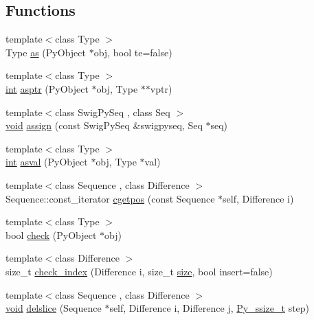 \subsection*{Functions}
\begin{DoxyCompactItemize}
\item 
{\footnotesize template$<$class Type $>$ }\\Type \hyperlink{namespaceswig_a67bb415fcd0242b33b98332e38040546}{as} (Py\+Object $\ast$obj, bool te=false)
\item 
{\footnotesize template$<$class Type $>$ }\\\hyperlink{lp__lib_8h_adeb9ec6400320e4923ac9d836d509ddb}{int} \hyperlink{namespaceswig_aafe1fc46b9f89108d98d52d7bca8942b}{asptr} (Py\+Object $\ast$obj, Type $\ast$$\ast$vptr)
\item 
{\footnotesize template$<$class Swig\+Py\+Seq , class Seq $>$ }\\\hyperlink{lp__lib_8h_ac7828c7b2b31d2e11af17bdb6289c5d9}{void} \hyperlink{namespaceswig_ad10b8f1b53b61dd4a9101e1cd8614262}{assign} (const Swig\+Py\+Seq \&swigpyseq, Seq $\ast$seq)
\item 
{\footnotesize template$<$class Type $>$ }\\\hyperlink{lp__lib_8h_adeb9ec6400320e4923ac9d836d509ddb}{int} \hyperlink{namespaceswig_a0c849f14b53dbad5c78124f7d7be69f1}{asval} (Py\+Object $\ast$obj, Type $\ast$val)
\item 
{\footnotesize template$<$class Sequence , class Difference $>$ }\\Sequence\+::const\+\_\+iterator \hyperlink{namespaceswig_a3e4de99498e78ee45e114f32a533f42e}{cgetpos} (const Sequence $\ast$self, Difference i)
\item 
{\footnotesize template$<$class Type $>$ }\\bool \hyperlink{namespaceswig_a428f235cf1ad33edc806647c1392240d}{check} (Py\+Object $\ast$obj)
\item 
{\footnotesize template$<$class Difference $>$ }\\size\+\_\+t \hyperlink{namespaceswig_ad634e52c1b165ad5b3b7dcfda9eccec0}{check\+\_\+index} (Difference i, size\+\_\+t \hyperlink{ioapi_8h_a3728291d90c8c81bb270d14427a775d7}{size}, bool insert=false)
\item 
{\footnotesize template$<$class Sequence , class Difference $>$ }\\\hyperlink{lp__lib_8h_ac7828c7b2b31d2e11af17bdb6289c5d9}{void} \hyperlink{namespaceswig_a9d3d629d8459e58b1e78a5a1ff378bf0}{delslice} (Sequence $\ast$self, Difference i, Difference \hyperlink{lp__lib_8h_a06b53c1efb3823879093de05b4e0b46b}{j}, \hyperlink{libstructural__wrap__python_8cpp_a47424a8953c340f500027db7e6c00173}{Py\+\_\+ssize\+\_\+t} step)
$$
\end{DoxyCompactItemize}

